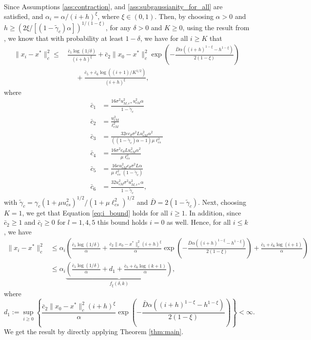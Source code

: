 \documentclass[letterpaper, 10 pt]{article}
\begin{document}
    Since Assumptions \ref{ass:contraction}, and \ref{ass:subgaussianity_for_all} are satisfied, and $\alpha_i=\alpha/(i+h)^\xi$, where $\xi\in (0,1)$. Then, by choosing $\alpha>0$ and $h\geq (2\xi/[(1-\tilde{\gamma}_c)\alpha])^{1/(1-\xi)}$, for any $\delta>0$ and $K\geq 0$, using the result from \cite[Theorem 2.4]{chen2023concentration}, we know that with probability at least $1-\delta$, we have for all $i\geq K$ that
    \begin{align}
        \|x_i-x^*\|_c^2\leq\,&\frac{\bar{c}_1\log(1/\delta)}{(i+h)^\xi}+\bar{c}_2\|x_0-x^*\|_c^2 \exp\left(-\frac{\bar{D}\alpha ((i+h)^{1 -\xi}-h^{1-\xi})}{2(1-\xi)}\right)\nonumber\\
        &\quad~+ \frac{\bar{c}_5 +\bar{c}_6\log((i+1)/K^{1/2})}{(i+h)^\xi},\label{eq:i_bound}
    \end{align}
    where
    \begin{align*}
        \bar{c}_1&=\frac{16\sigma^2u_{M,c*}^2 u_{cM}^2\alpha}{1-\tilde{\gamma}_c} \\
        \bar{c}_2&=\frac{u_{cM}^2}{\ell_{cM}^2} \\
        \bar{c}_3&= \frac{32e c_d\sigma^2 L u_{cM}^2\alpha^2}{((1-\tilde{\gamma}_c)\alpha-1)\mu\ell_{cs}^2}\\
        \bar{c}_4&= \frac{16\sigma^2 c_d L u_{cM}^2\alpha^2}{\mu\ell_{cs}^2} \\
        \bar{c}_5&= \frac{16 eu_{cM}^2 c_d\sigma^2 L\alpha}{\mu\ell_{cs}^2(1-\tilde{\gamma}_c)} \\
        \bar{c}_6&= \frac{32 u_{cM}^2 \sigma^2u_{M,c*}^2 \alpha}{1-\tilde{\gamma}_c},
    \end{align*}with $\tilde{\gamma}_c=\gamma_c (1+\mu u_{cs}^2)^{1/2}/(1+\mu \ell_{cs}^2)^{1/2}$ and $\bar{D}=2(1-\tilde{\gamma}_c)$. Next, choosing $K=1$, we get that Equation \eqref{eq:i_bound} holds for all $i\geq1$. In addition, since $\bar{c}_2\geq1$ and $\bar{c}_l\geq0$ for $l=1,4,5$ this bound holds $i=0$ as well. Hence, for all $i\leq k$, we have
    \begin{align}
        \|x_i-x^*\|_c^2&\leq\alpha_i\left(\frac{\bar{c}_1\log(1/\delta)}{\alpha}+\frac{\bar{c}_2\|x_0-x^*\|_c^2(i+h)^\xi}{\alpha}\exp\left(-\frac{\bar{D}\alpha ((i+h)^{1-\xi}-h^{1-\xi})}{2(1-\xi)}\right) + \frac{\bar{c}_5 +\bar{c}_6\log(i+1)}{\alpha}\right)\nonumber\\
        &\leq \alpha_i\underbrace{\left(\frac{\bar{c}_1\log(1/\delta)}{\alpha}+d_1+ \frac{\bar{c}_5 +\bar{c}_6\log(k+1)}{\alpha}\right)}_{f_\xi(\delta,k)},\label{eq:f_xi}
    \end{align}
    where
    \[ d_1 := \sup\limits_{i\geq 0} \left\{ \frac{\bar{c}_2\|x_0-x^*\|_c^2(i+h)^\xi}{\alpha}\exp\left(-\frac{\bar{D}\alpha ((i+h)^{1-\xi}-h^{1-\xi})}{2(1-\xi)}\right) \right\} < \infty. \]
    We get the result by directly applying Theorem \ref{thm:main}.
\end{document}
